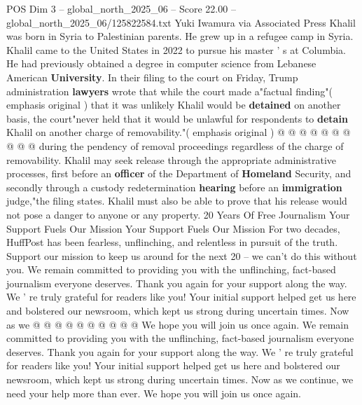 \begin{textsample}{POS Dim 3 – global\_north\_2025\_06 – Score 22.00 – global\_north\_2025\_06/125822584.txt}
Yuki Iwamura via Associated Press Khalil was born in Syria to Palestinian parents.
He grew up in a refugee camp in Syria.
Khalil came to the United States in 2022 to pursue his master ' s at Columbia.
He had previously obtained a degree in computer science from Lebanese American \textbf{University}.
In their filing to the court on Friday, Trump administration \textbf{lawyers} wrote that while the court made a"factual finding"( emphasis original ) that it was unlikely Khalil would be \textbf{detained} on another basis, the court"never held that it would be unlawful for respondents to \textbf{detain} Khalil on another charge of removability."( emphasis original ) @ @ @ @ @ @ @ @ @ @ during the pendency of removal proceedings regardless of the charge of removability.
Khalil may seek release through the appropriate administrative processes, first before an \textbf{officer} of the Department of \textbf{Homeland} Security, and secondly through a custody redetermination \textbf{hearing} before an \textbf{immigration} judge,"the filing states.
Khalil must also be able to prove that his release would not pose a danger to anyone or any property. 20 Years Of Free Journalism Your Support Fuels Our Mission Your Support Fuels Our Mission For two decades, HuffPost has been fearless, unflinching, and relentless in pursuit of the truth.
Support our mission to keep us around for the next 20 -- we can't do this without you.
We remain committed to providing you with the unflinching, fact-based journalism everyone deserves.
Thank you again for your support along the way.
We ' re truly grateful for readers like you!
Your initial support helped get us here and bolstered our newsroom, which kept us strong during uncertain times.
Now as we @ @ @ @ @ @ @ @ @ @ We hope you will join us once again.
We remain committed to providing you with the unflinching, fact-based journalism everyone deserves.
Thank you again for your support along the way.
We ' re truly grateful for readers like you!
Your initial support helped get us here and bolstered our newsroom, which kept us strong during uncertain times.
Now as we continue, we need your help more than ever.
We hope you will join us once again.

\end{textsample}
